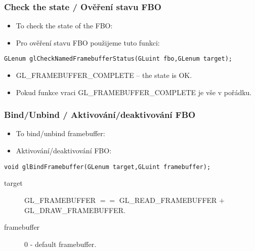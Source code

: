 \begin{frame}[fragile]\frametitle{Check the state / Ověření stavu FBO}\scriptsize
  \begin{itemize}
    \item To check the state of the FBO:
    \item Pro ověření stavu FBO použijeme tuto funkci:
   \end{itemize}

\begin{verbatim}
GLenum glCheckNamedFramebufferStatus(GLuint fbo,GLenum target);
\end{verbatim}

  \begin{itemize}
    \item {\color{red} GL\_FRAMEBUFFER\_COMPLETE} -- the state is OK.
    \item Pokud funkce vraci {\color{red} GL\_FRAMEBUFFER\_COMPLETE} je vše v pořádku.
  \end{itemize}
\end{frame}


\begin{frame}[fragile]\frametitle{Bind/Unbind / Aktivování/deaktivování FBO}\scriptsize
\begin{itemize}
  \item To bind/unbind framebuffer:
  \item Aktivování/deaktivování FBO:
\end{itemize}

\begin{verbatim}
void glBindFramebuffer(GLenum target,GLuint framebuffer);
\end{verbatim}

\begin{description}
  \item[target] GL\_FRAMEBUFFER $==$ GL\_READ\_FRAMEBUFFER $+$ GL\_DRAW\_FRAMEBUFFER.
  \item[framebuffer] 0 - default framebuffer.
\end{description}
\end{frame}

